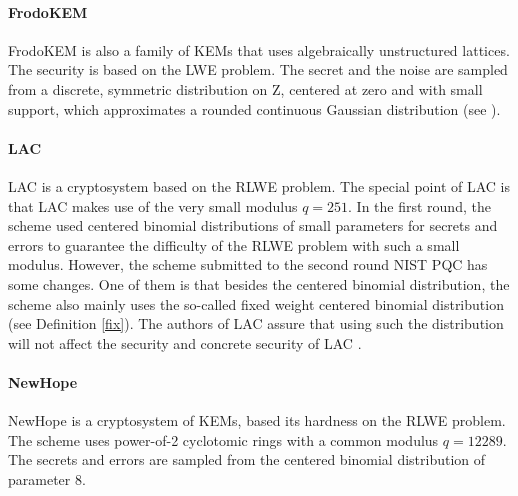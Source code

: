 \documentclass{cta-author}
\begin{document}
\paragraph{FrodoKEM \cite{ABD+19}} FrodoKEM is also a family of KEMs that uses algebraically unstructured lattices. The security is based on the LWE problem. The secret and the noise are sampled from a discrete, symmetric distribution on Z, centered at zero and
with small support, which approximates a rounded continuous Gaussian distribution (see \cite[Definition 2.11]{ABD+19}).

\paragraph{LAC \cite{LLJ+19}}

LAC is a cryptosystem based on the RLWE problem. The special point of LAC is that LAC makes use of the very small modulus $q =251$. In the first round, the scheme used centered binomial distributions of small parameters for secrets and errors to guarantee the difficulty of the RLWE problem with such a small modulus. However, the scheme submitted to the second round NIST PQC has some changes. One of them is that besides the centered binomial distribution, the scheme also mainly uses the so-called fixed weight centered binomial distribution (see Definition \ref{fix}). The authors of LAC assure that using such the distribution will not affect the security and concrete security of LAC \cite[Section 5.2]{LLJ+19}.


\paragraph{NewHope \cite{AAB+19}} 
NewHope is a cryptosystem of KEMs, based its hardness on the RLWE problem. The scheme uses power-of-2 cyclotomic rings with a common modulus $q=12289$. The secrets and errors are sampled from the centered binomial distribution of parameter $8$. 
\end{document}
